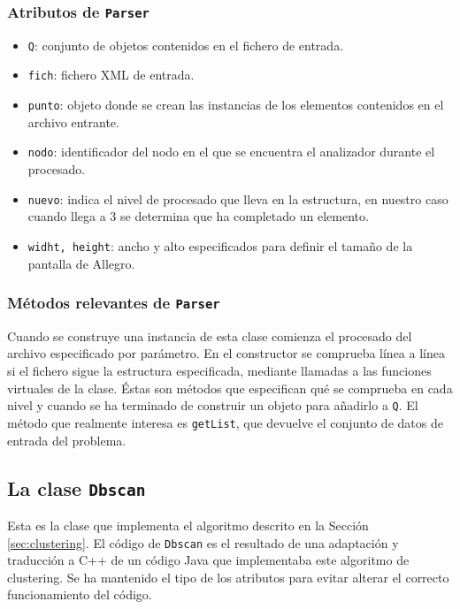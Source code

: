 \subsubsection{Atributos de \texttt{Parser}}
\begin{itemize}
\item \texttt{Q}: conjunto de objetos contenidos en el fichero de entrada.
\item \texttt{fich}: fichero XML de entrada.
\item \texttt{punto}: objeto donde se crean las instancias de los elementos
contenidos en el archivo entrante.
\item \texttt{nodo}: identificador del  nodo en el que se encuentra el
analizador durante el procesado.
\item \texttt{nuevo}: indica el nivel de procesado que lleva en la estructura,
en nuestro caso cuando llega a 3 se determina que ha completado un elemento.
\item \texttt{widht, height}: ancho y alto especificados para definir el tamaño
de la pantalla de Allegro.
\end{itemize}
\subsubsection{Métodos relevantes de \texttt{Parser}}
Cuando se construye una instancia de esta clase comienza el procesado del
archivo especificado por parámetro. En el constructor se comprueba línea a línea
si el fichero sigue la estructura especificada, mediante llamadas a las funciones
virtuales de la clase. Éstas son métodos que especifican qué se comprueba en
cada nivel y cuando se ha terminado de construir un objeto para añadirlo a
\texttt{Q}. El método que realmente interesa es \texttt{getList}, que
devuelve el conjunto de datos de entrada del problema.

\subsection{La clase \texttt{Dbscan}} \label{sec:dbscan}
Esta es la clase que implementa el algoritmo descrito en la Sección
\ref{sec:clustering}. El código de \texttt{Dbscan} es el resultado de una
adaptación y traducción a C++ de un código Java que implementaba este algoritmo de clustering.
Se ha mantenido el tipo de los atributos para evitar alterar el correcto
funcionamiento del código. 


